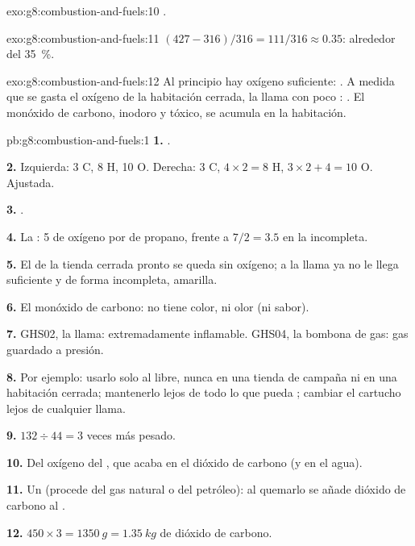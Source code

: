 \begin{solution}{exo:g8:combustion-and-fuels:10}
.
\end{solution}

\begin{solution}{exo:g8:combustion-and-fuels:11}
$(427 - 316)/316 = 111/316 \approx 0.35$: alrededor del \qty{35}{\percent}.
\end{solution}

\begin{solution}{exo:g8:combustion-and-fuels:12}
Al principio hay oxígeno suficiente: . A
medida que se gasta el oxígeno de la habitación cerrada, la llama 
con poco :
. El monóxido de carbono, inodoro y
tóxico, se acumula en la habitación.
\end{solution}

\begin{solution}{pb:g8:combustion-and-fuels:1}
\textbf{1.} .

\textbf{2.} Izquierda: 3 C, 8 H, 10 O. Derecha: 3 C, $4 \times 2 = 8$ H,
$3 \times 2 + 4 = 10$ O. Ajustada.

\textbf{3.} .

\textbf{4.} La : 5  de oxígeno por 
de propano, frente a $7/2 = 3.5$ en la incompleta.

\textbf{5.} El  de la tienda cerrada pronto se queda sin oxígeno; a
la llama ya no le llega suficiente y  de forma incompleta, amarilla.

\textbf{6.} El monóxido de carbono: no tiene color, ni olor (ni sabor).

\textbf{7.} GHS02, la llama: extremadamente inflamable. GHS04, la
bombona de gas: gas guardado a presión.

\textbf{8.} Por ejemplo: usarlo solo al  libre, nunca en una tienda
de campaña ni en una habitación cerrada; mantenerlo lejos de todo lo que
pueda ; cambiar el cartucho lejos de cualquier llama.

\textbf{9.} $132 \div 44 = 3$ veces más pesado.

\textbf{10.} Del oxígeno del , que acaba en el dióxido de carbono (y
en el agua).

\textbf{11.} Un  (procede del gas natural o del
petróleo): al quemarlo se añade dióxido de carbono al .

\textbf{12.} $450 \times 3 = \qty{1350}{g} = \qty{1.35}{kg}$ de dióxido
de carbono.
\end{solution}
